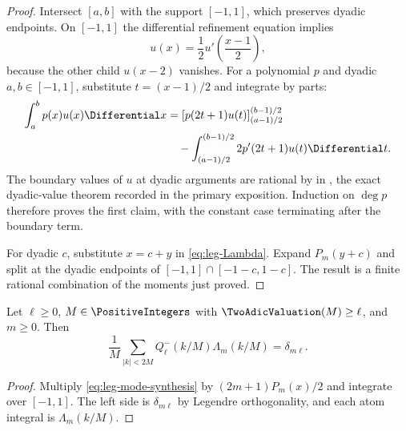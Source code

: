 \begin{proof}
Intersect $[a,b]$ with the support $[-1,1]$, which preserves dyadic
endpoints.  On $[-1,1]$ the differential refinement equation implies
\[
 u(x)=\frac12u'\!\left(\frac{x-1}{2}\right),
\]
because the other child $u(x-2)$ vanishes.  For a polynomial $p$ and dyadic
$a,b\in[-1,1]$, substitute $t=(x-1)/2$ and integrate by parts:
\begin{align*}
 \int_a^bp(x)u(x)\Differential x
 &=
 \left[p(2t+1)u(t)\right]_{(a-1)/2}^{(b-1)/2}\\
 &\quad-\int_{(a-1)/2}^{(b-1)/2}
 2p'(2t+1)u(t)\Differential t.
\end{align*}
The boundary values of $u$ at dyadic arguments are rational by
 in , the exact
dyadic-value theorem recorded in the primary exposition.  Induction on $\deg p$
therefore proves the first claim, with the constant case terminating after
the boundary term.

For dyadic $c$, substitute $x=c+y$ in \eqref{eq:leg-Lambda}.  Expand
$P_m(y+c)$ and split at the dyadic endpoints of
$[-1,1]\cap[-1-c,1-c]$.  The result is a finite rational combination of the
moments just proved.
\end{proof}

\begin{theorem}
\label{thm:leg-biorthogonality}
Let $\ell\ge0$, $M\in\PositiveIntegers$ with $\TwoAdicValuation(M)\ge\ell$, and $m\ge0$.
Then
\begin{equation}
 \boxed{
 \frac1M\sum_{|k|<2M}
 Q_\ell^-(k/M)\Lambda_m(k/M)=\delta_{m\ell}.}
 \label{eq:leg-biorthogonality}
\end{equation}
\end{theorem}

\begin{proof}
Multiply \eqref{eq:leg-mode-synthesis} by
$(2m+1)P_m(x)/2$ and integrate over $[-1,1]$.  The left side is
$\delta_{m\ell}$ by Legendre orthogonality, and each atom integral is
$\Lambda_m(k/M)$.
\end{proof}

